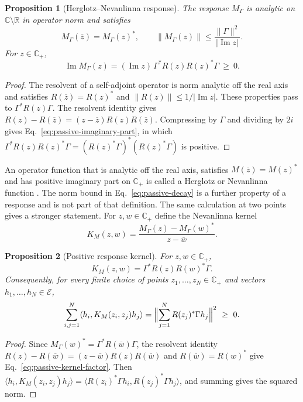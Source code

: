 \documentclass[11pt]{article}
\newtheorem{proposition}{Proposition}[section]
\theoremstyle{definition}
\newcommand{\C}{\mathbb C}
\newcommand{\R}{\mathbb R}
\begin{document}
\begin{proposition}[Herglotz--Nevanlinna response]
\label{prop:passive-herglotz}
The response $M_\Gamma$ is analytic on $\C\setminus\R$ in operator norm and satisfies
\begin{equation}
 M_\Gamma(\overline z)=M_\Gamma(z)^*,\qquad \|M_\Gamma(z)\|\le\frac{\|\Gamma\|^2}{|\operatorname{Im}z|} .
 \label{eq:passive-decay}
\end{equation}
For $z\in\C_+$,
\begin{equation}
 \operatorname{Im}M_\Gamma(z)=(\operatorname{Im}z)\,\Gamma^*R(z)R(z)^*\Gamma\ \geq\ 0 .
 \label{eq:passive-imaginary-part}
\end{equation}
\end{proposition}
\begin{proof}
The resolvent of a self-adjoint operator is norm analytic off the real axis and satisfies $R(\overline z)=R(z)^*$ and $\|R(z)\|\le1/|\operatorname{Im}z|$. These properties pass to $\Gamma^*R(z)\Gamma$. The resolvent identity gives $R(z)-R(\overline z)=(z-\overline z)R(z)R(\overline z)$. Compressing by $\Gamma$ and dividing by $2i$ gives Eq.~\eqref{eq:passive-imaginary-part}, in which $\Gamma^*R(z)R(z)^*\Gamma=(R(z)^*\Gamma)^*(R(z)^*\Gamma)$ is positive.
\end{proof}

An operator function that is analytic off the real axis, satisfies $M(\overline z)=M(z)^*$ and has positive imaginary part on $\C_+$ is called a Herglotz or Nevanlinna function \cite{Donoghue}. The norm bound in Eq.~\eqref{eq:passive-decay} is a further property of a response and is not part of that definition. The same calculation at two points gives a stronger statement. For $z,w\in\C_+$ define the Nevanlinna kernel
\begin{equation}
 K_M(z,w)=\frac{M_\Gamma(z)-M_\Gamma(w)^*}{z-\overline w}.
 \label{eq:passive-nevanlinna-kernel}
\end{equation}

\begin{proposition}[Positive response kernel]
\label{prop:passive-kernel}
For $z,w\in\C_+$,
\begin{equation}
 K_M(z,w)=\Gamma^*R(z)R(w)^*\Gamma .
 \label{eq:passive-kernel-factor}
\end{equation}
Consequently, for every finite choice of points $z_1,\dots,z_N\in\C_+$ and vectors $h_1,\dots,h_N\in\mathcal E$,
\begin{equation}
 \sum_{i,j=1}^N\langle h_i,K_M(z_i,z_j)h_j\rangle
   =\Bigl\|\sum_{j=1}^N R(z_j)^*\Gamma h_j\Bigr\|^2\ \geq\ 0 .
 \label{eq:passive-kernel-positive}
\end{equation}
\end{proposition}
\begin{proof}
Since $M_\Gamma(w)^*=\Gamma^*R(\overline w)\Gamma$, the resolvent identity $R(z)-R(\overline w)=(z-\overline w)R(z)R(\overline w)$ and $R(\overline w)=R(w)^*$ give Eq.~\eqref{eq:passive-kernel-factor}. Then $\langle h_i,K_M(z_i,z_j)h_j\rangle=\langle R(z_i)^*\Gamma h_i,R(z_j)^*\Gamma h_j\rangle$, and summing gives the squared norm.
\end{proof}
\end{document}
